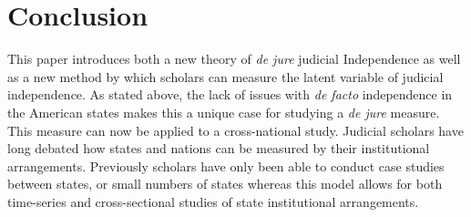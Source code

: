 \documentclass[12pt]{article}
\begin{document}
\section*{Conclusion} 
This paper introduces both a new theory of \textit{de jure} judicial Independence as well as a new method by which scholars can measure the latent variable of judicial independence.  As stated above, the lack of issues with \textit{de facto} independence in the American states makes this a unique case for studying a \textit{de jure} measure.  This measure can now be applied to a cross-national study.  Judicial scholars have long debated how states and nations can be measured by their institutional arrangements.  Previously scholars have only been able to conduct case studies between states, or small numbers of states whereas this model allows for both time-series and cross-sectional studies of state institutional arrangements.

\singlespacing


\appendix
\end{document}
